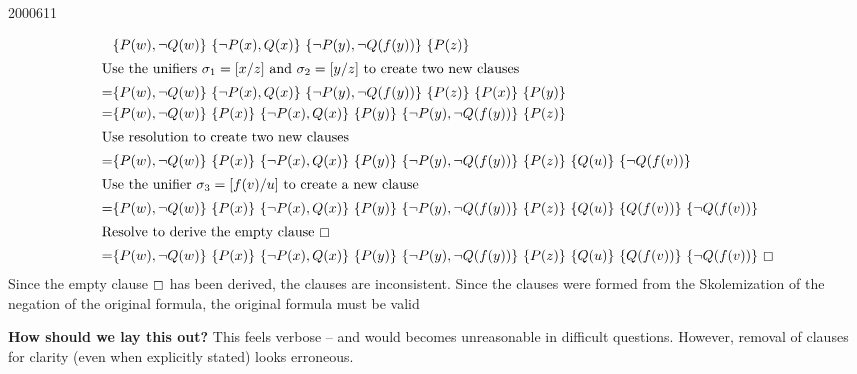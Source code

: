 \documentclass[10pt,\jkfside,a4paper]{article}
\begin{document}
\begin{examquestion}{2000}{6}{11}
\begin{enumerate}
\begin{align*}
& \{P(w), \neg Q(w)\}\ \{\neg P(x), Q(x)\}\ \{\neg P(y), \neg Q(f(y))\}\ \{P
(z)\} \\
\intertext{Use the unifiers $\sigma_1=[x/z]$ and $\sigma_2=[y/z]$ to create
two new clauses}
=& \{P(w), \neg Q(w)\}\ \{\neg P(x), Q(x)\}\ \{\neg P(y), \neg Q(f(y))\}\ \{P
(z)\}\ \{P(x)\}\ \{P(y)\} \\
=& \{P(w), \neg Q(w)\}\ \{P(x)\}\ \{\neg P(x), Q(x)\}\ \{P(y)\}\ \{\neg P
(y), \neg Q(f(y))\}\ \{P(z)\}\ \\
\intertext{Use resolution to create two new clauses}
=& \{P(w), \neg Q(w)\}\ \{P(x)\}\ \{\neg P(x), Q(x)\}\ \{P(y)\}\ \{\neg P
(y), \neg Q(f(y))\}\ \{P(z)\}\ \{Q(u)\}\ \{\neg Q(f(v))\} \\
\intertext{Use the unifier $\sigma_3=[f(v)/u]$ to create a new clause}
=& \{P(w), \neg Q(w)\}\ \{P(x)\}\ \{\neg P(x), Q(x)\}\ \{P(y)\}\ \{\neg P
(y), \neg Q(f(y))\}\ \{P(z)\}\ \{Q(u)\}\ \{Q(f(v))\}\ \{\neg Q(f(v))\} \\
\intertext{Resolve to derive the empty clause $\boxempty$}
=& \{P(w), \neg Q(w)\}\ \{P(x)\}\ \{\neg P(x), Q(x)\}\ \{P(y)\}\ \{\neg P
(y), \neg Q(f(y))\}\ \{P(z)\}\ \{Q(u)\}\ \{Q(f(v))\}\ \{\neg Q(f(v))\}\
\boxempty
\end{align*}
Since the empty clause $\boxempty$ has been derived, the clauses
are inconsistent. Since the clauses were formed from the Skolemization of
the negation of the original formula, the original formula must be
valid

\textbf{How should we lay this out?} This feels verbose -- and would
becomes unreasonable in difficult questions. However, removal of clauses for
clarity (even when explicitly stated) looks erroneous.

\end{enumerate}

\end{examquestion}
\end{document}

